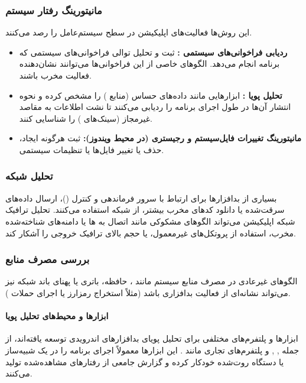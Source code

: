 \subsubsection{مانیتورینگ رفتار سیستم}
این روش‌ها فعالیت‌های اپلیکیشن در سطح سیستم‌عامل را رصد می‌کنند.
\begin{itemize}
    \renewcommand{\labelitemi}{\lr{$\bullet$}}
    \item \textbf{ردیابی فراخوانی‌های سیستمی :} ثبت و تحلیل توالی فراخوانی‌های سیستمی که برنامه انجام می‌دهد. الگوهای خاصی از این فراخوانی‌ها می‌توانند نشان‌دهنده فعالیت مخرب باشند.
    \item \textbf{تحلیل  پویا :} ابزارهایی مانند  داده‌های حساس (منابع ) را مشخص کرده و نحوه انتشار آن‌ها در طول اجرای برنامه را ردیابی می‌کنند تا نشت اطلاعات به مقاصد غیرمجاز (سینک‌های ) را شناسایی کنند.
    \item \textbf{مانیتورینگ تغییرات فایل‌سیستم و رجیستری (در محیط ویندوز):} ثبت هرگونه ایجاد، حذف یا تغییر فایل‌ها یا تنظیمات سیستمی.
\end{itemize}

\subsubsection{تحلیل شبکه}
بسیاری از بدافزارها برای ارتباط با سرور فرماندهی و کنترل ()، ارسال داده‌های سرقت‌شده یا دانلود کدهای مخرب بیشتر، از شبکه استفاده می‌کنند. تحلیل ترافیک شبکه اپلیکیشن می‌تواند الگوهای مشکوکی مانند اتصال به ها یا دامنه‌های شناخته‌شده مخرب، استفاده از پروتکل‌های غیرمعمول، یا حجم بالای ترافیک خروجی را آشکار کند.

\subsubsection{بررسی مصرف منابع}
الگوهای غیرعادی در مصرف منابع سیستم مانند ، حافظه، باتری یا پهنای باند شبکه نیز می‌تواند نشانه‌ای از فعالیت بدافزاری باشد (مثلاً استخراج رمزارز یا اجرای حملات ).

\paragraph{ابزارها و محیط‌های تحلیل پویا}
ابزارها و پلتفرم‌های مختلفی برای تحلیل پویای بدافزارهای اندرویدی توسعه یافته‌اند، از جمله , ,  و پلتفرم‌های تجاری مانند . این ابزارها معمولاً اجرای برنامه را در یک شبیه‌ساز یا دستگاه روت‌شده خودکار کرده و گزارش جامعی از رفتارهای مشاهده‌شده تولید می‌کنند.

